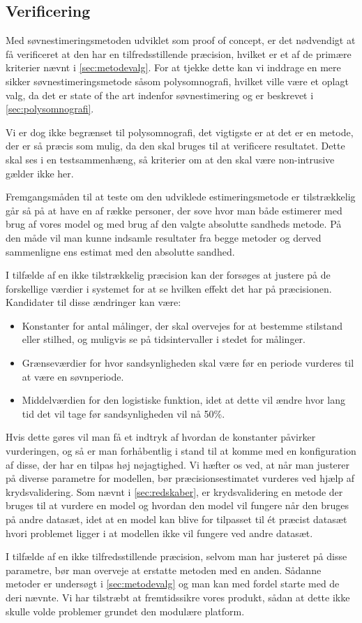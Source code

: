\subsection{Verificering}
Med søvnestimeringsmetoden udviklet som proof of concept, er det nødvendigt at få verificeret at den har en tilfredsstillende præcision, hvilket er et af de primære kriterier nævnt i \cref{sec:metodevalg}.
For at tjekke dette kan vi inddrage en mere sikker søvnestimeringsmetode såsom polysomnografi, hvilket ville være et oplagt valg, da det er state of the art indenfor søvnestimering og er beskrevet i \cref{sec:polysomnografi}.

Vi er dog ikke begrænset til polysomnografi, det vigtigste er at det er en metode, der er så præcis som mulig, da den skal bruges til at verificere resultatet.
Dette skal ses i en testsammenhæng, så kriterier om at den skal være non-intrusive gælder ikke her.

Fremgangsmåden til at teste om den udviklede estimeringsmetode er tilstrækkelig går så på at have en af række personer, der sove hvor man både estimerer med brug af vores model og med brug af den valgte absolutte sandheds metode.
På den måde vil man kunne indsamle resultater fra begge metoder og derved sammenligne ens estimat med den absolutte sandhed.

I tilfælde af en ikke tilstrækkelig præcision kan der forsøges at justere på de forskellige værdier i systemet for at se hvilken effekt det har på præcisionen.
Kandidater til disse ændringer kan være:
\begin{itemize}
	\item Konstanter for antal målinger, der skal overvejes for at bestemme stilstand eller stilhed, og muligvis se på tidsintervaller i stedet for målinger.
	\item Grænseværdier for hvor sandsynligheden skal være før en periode vurderes til at være en søvnperiode.
	\item Middelværdien for den logistiske funktion, idet at dette vil ændre hvor lang tid det vil tage før sandsynligheden vil nå 50\%.
\end{itemize} 

Hvis dette gøres vil man få et indtryk af hvordan de konstanter påvirker vurderingen, og så er man forhåbentlig i stand til at komme med en konfiguration af disse, der har en tilpas høj nøjagtighed.
Vi hæfter os ved, at når man justerer på diverse parametre for modellen, bør præcisionsestimatet vurderes ved hjælp af krydsvalidering.
Som nævnt i \cref{sec:redskaber}, er krydsvalidering en metode der bruges til at vurdere en model og hvordan den model vil fungere når den bruges på andre datasæt, idet at en model kan blive for tilpasset til ét præcist datasæt hvori problemet ligger i at modellen ikke vil fungere ved andre datasæt.

I tilfælde af en ikke tilfredsstillende præcision, selvom man har justeret på disse parametre, bør man overveje at erstatte metoden med en anden.
Sådanne metoder er undersøgt i \cref{sec:metodevalg} og man kan med fordel starte med de deri nævnte.
Vi har tilstræbt at fremtidssikre vores produkt, sådan at dette ikke skulle volde problemer grundet den modulære platform.